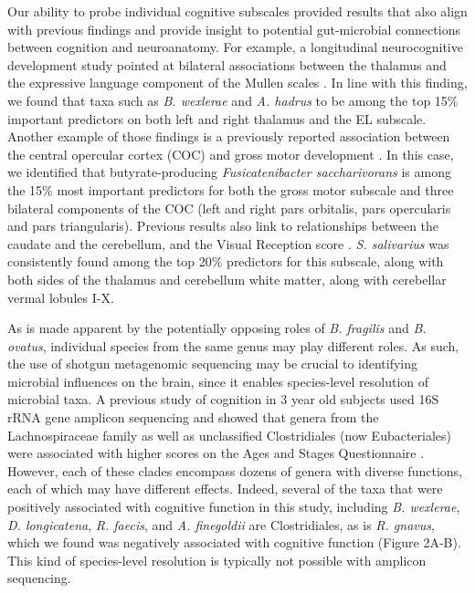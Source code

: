 \documentclass{article}
\begin{document}
Our ability to probe individual cognitive subscales provided
results that also align with previous findings and provide insight to
potential gut-microbial connections between cognition and neuroanatomy.
For example, a longitudinal neurocognitive development study pointed at bilateral
associations between the thalamus and the expressive language
component of the Mullen scales \cite{chenLongitudinalBrainMullen2023}.
In line with this finding, we found that taxa such as 
\textit{B. wexlerae} and \textit{A. hadrus} to be among the top 15\% important predictors
on both left and right thalamus and the EL subscale.
Another example of those findings is a previously reported association between
the central opercular cortex (COC) and gross motor development \cite{jiangBrainNetworkCognition2023}. In this case, we identified that
butyrate-producing \textit{Fusicatenibacter saccharivorans} is among the 15\% most important predictors
for both the gross motor subscale and three bilateral components of the COC
(left and right pars orbitalis, pars opercularis and pars triangularis).
Previous results also link to relationships between the caudate and the cerebellum,
and the Visual Reception score \cite{deoniMyelinationMullenPreprint2022}.
\textit{S. salivarius} was consistently found among the top 20\% predictors for this subscale, along with
both sides of the thalamus and cerebellum white matter, along with cerebellar vermal lobules I-X.

As is made apparent by the potentially opposing roles of 
\textit{B. fragilis} and \textit{B. ovatus},
individual species from the same genus may play different roles.
As such, the use of shotgun metagenomic sequencing
may be crucial to identifying microbial influences on the brain,
since it enables species-level resolution of microbial taxa.
A previous study of
cognition in 3 year old subjects used 16S rRNA gene amplicon sequencing
and showed that genera from the Lachnospiraceae family as well as
unclassified Clostridiales (now Eubacteriales) were associated with
higher scores on the Ages and Stages Questionnaire
\cite{sordilloAssociationInfantGut2019}.
However, each of these clades encompass dozens of genera with
diverse functions, each of which may have different effects. Indeed,
several of the taxa that were positively associated with cognitive
function in this study, including \emph{B. wexlerae}, \emph{D.
longicatena}, \emph{R. faecis}, and \emph{A. finegoldii} are
Clostridiales, as is \emph{R. gnavus}, which we found was negatively
associated with cognitive function (Figure 2A-B). This kind of
species-level resolution is typically not possible with amplicon
sequencing.
\end{document}
